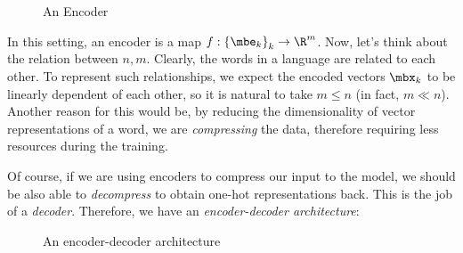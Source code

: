 \documentclass[11pt]{article}
\begin{document}
    \begin{figure}[H]
        \center
            \begin{center}
            \end{center}
        \caption{An Encoder}
    \end{figure}
       
    \noindent In this setting, an encoder is a map $f:\left\lbrace \mbe_k \right\rbrace_k\to\R^m$. Now, let's think about the relation between $n,m$. Clearly, the words in a language are related to each other. To represent such relationships, we expect the encoded vectors $\mbx_k$ to be linearly dependent of each other, so it is natural to take $m\leq n$ (in fact, $m\ll n$). Another reason for this would be, by reducing the dimensionality of vector representations of a word, we are \textit{compressing} the data, therefore requiring less resources during the training.

    Of course, if we are using encoders to compress our input to the model, we should be also able to \textit{decompress} to obtain one-hot representations back. This is the job of a \textit{decoder}. Therefore, we have an \textit{encoder-decoder architecture}:
    
    \begin{figure}[H]
        \center
            \begin{center}
            \end{center}
        \caption{An encoder-decoder architecture}
    \end{figure}
    
\end{document}
